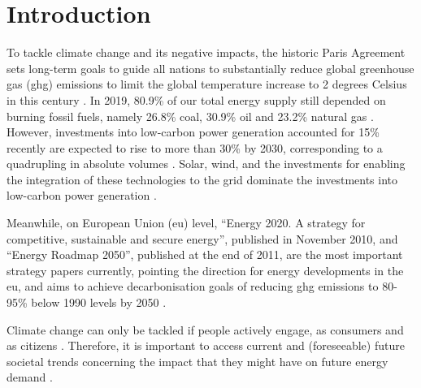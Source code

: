 \chapter{Introduction} 

To tackle climate change and its negative impacts, 
the historic Paris Agreement 
sets long-term goals to guide all nations 
to substantially reduce global greenhouse gas (\gls{ghg}) emissions 
to limit the global temperature increase
to 2 degrees Celsius in this century \cite{paris}. 
In 2019, 
80.9\% of our total energy supply still depended on burning fossil fuels, 
namely 
26.8\% coal, 30.9\% oil and 23.2\% natural gas \cite{iea}. 
However, 
investments into low-carbon power generation 
accounted for 15\% recently 
are expected to rise to more than 30\% by 2030, 
corresponding to a quadrupling in absolute volumes \cite{shift}. 
Solar, wind, and the investments 
for enabling the integration of these technologies to the grid 
dominate the investments into low-carbon power generation \cite{shift}. 

Meanwhile, on European Union (\gls{eu}) level, 
“Energy 2020. A strategy for competitive, sustainable and secure energy”, 
published in November 2010,
and 
“Energy Roadmap 2050”, 
published at the end of 2011,
are the most important strategy papers currently,  
pointing the direction for energy developments in the \gls{eu},  
and aims to achieve decarbonisation goals 
of reducing \gls{ghg} emissions to 80-95\% below 1990 levels
by 2050 \cite{roadmap}. 

Climate change can only be tackled 
if people actively engage, 
as consumers and as citizens \cite{clean}. 
Therefore, it is important to access current and (foreseeable) future societal trends 
concerning the impact 
that they might have on future energy demand \cite{2050}. 


